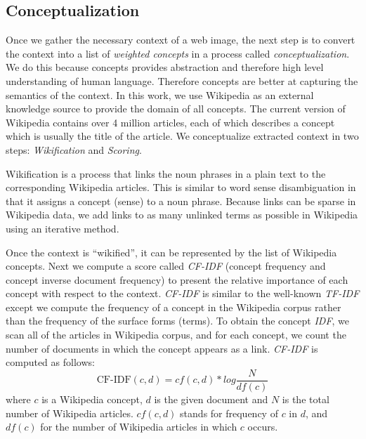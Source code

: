 \subsection{Conceptualization}
Once we gather the necessary context of a web image,
the next step is to convert the context into a list of {\em weighted concepts}
in a process called {\em conceptualization}.
We do this because concepts provides abstraction and therefore high level
understanding of human language. Therefore concepts are better at
capturing the semantics of the context. In this work, we use Wikipedia
as an external knowledge source to provide the domain of all concepts.
The current version of Wikipedia contains over 4 million articles, 
each of which describes a concept which is usually the title of the
article.
We conceptualize extracted context in two steps: \emph{Wikification} and 
\emph{Scoring}.

Wikification \cite{cucerzan2007large}
is a process that links the noun phrases in a 
plain text to the corresponding Wikipedia articles. 
This is similar to word sense disambiguation in that it assigns a
concept (sense) to a noun phrase.
Because links can be sparse in Wikipedia data, 
we add links to as many unlinked terms as possible in Wikipedia using an 
iterative method.


Once the context is ``wikified'', it can be represented by the list of
Wikipedia concepts. Next we compute a score called {\em CF-IDF} 
(concept frequency and concept inverse document frequency) to present
the relative importance of each concept with respect to the context.
{\em CF-IDF} is similar to the well-known \emph{TF-IDF} except we compute
the frequency of a concept in the Wikipedia corpus rather than the frequency
of the surface forms (terms). 
To obtain the concept \emph{IDF}, we scan all of the articles in 
Wikipedia corpus, and for each concept, we count the number of documents in
which the concept appears as a link. 
\emph{CF-IDF} is computed as follows:
\begin{equation}
\mbox{CF-IDF}(c, d) = cf(c, d) * log\frac{N}{df(c)}
\end{equation}
where $c$ is a Wikipedia concept, $d$ is the given document and 
$N$ is the total number of
Wikipedia articles. $cf(c,d)$ stands for frequency of $c$ in $d$, 
and $df(c)$ for the number of Wikipedia articles
in which $c$ occurs.

